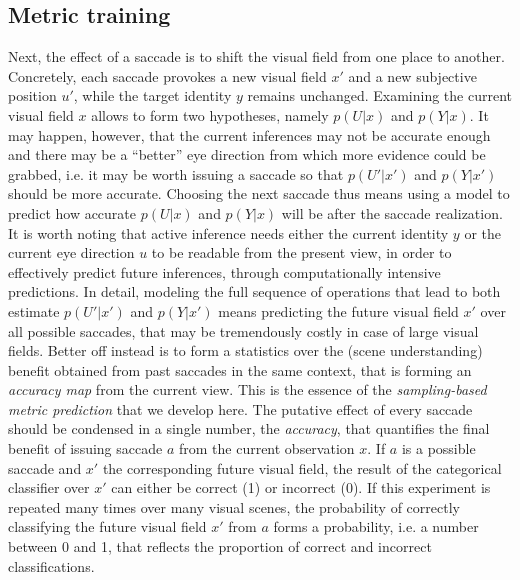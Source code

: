 \subsection{Metric training}
Next, the effect of a saccade is to shift the visual field from one place to another.
Concretely, each saccade provokes a new visual field $x'$ and a new subjective position $u'$, while the target identity $y$ remains unchanged. Examining the current visual field $x$ allows to form two hypotheses, namely $p(U|x)$ and $p(Y|x)$. It may happen, however, that the current inferences may not be accurate enough and there may be a ``better'' eye direction from which more evidence could be grabbed, i.e. it may be worth issuing a saccade so that $p(U'|x')$ and $p(Y|x')$ should be more accurate. Choosing the next saccade thus means using a model to predict how accurate $p(U|x)$ and $p(Y|x)$ will be after the saccade realization.
It is worth noting that active inference needs either the current identity $y$ or the current eye direction $u$ to be readable from the present view, in order to effectively predict future inferences, through computationally intensive predictions. In detail, modeling the full sequence of operations that lead to both estimate $p(U'|x')$ and $p(Y|x')$ means predicting the future visual field $x'$ over all possible saccades, that may be tremendously costly in case of large visual fields. 
Better off instead is to form a statistics over the (scene understanding) benefit obtained from past saccades in the same context, that is forming an \emph{accuracy map} from the current view. This is the essence of the \emph{sampling-based metric prediction} that we develop here. The putative effect of every saccade should be condensed in a single number, the \emph{accuracy}, that quantifies the final benefit of issuing saccade $a$ %
from the current observation $x$. If $a$ is a possible saccade and $x'$ the corresponding future visual field, the result of the categorical classifier over $x'$ can either be correct (1) or incorrect (0).
If this experiment is repeated many times over many visual scenes, the probability of correctly classifying the future visual field $x'$ from $a$ forms a probability, i.e. a number between 0 and 1, that reflects the proportion of correct and incorrect classifications.
